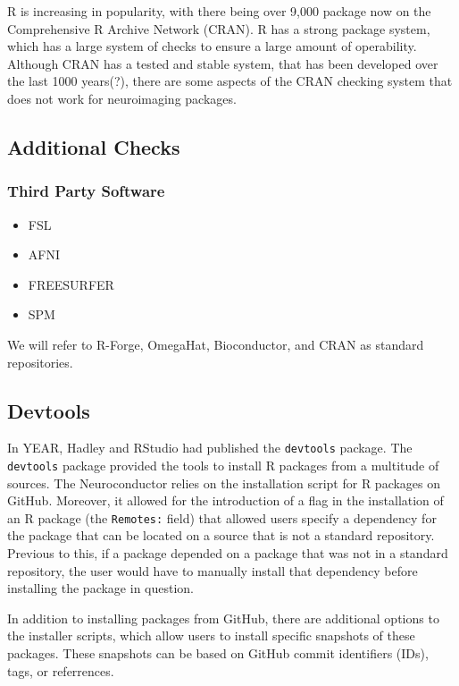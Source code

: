 \documentclass[]{elsarticle} %
\providecommand{\tightlist}{%
  \setlength{\itemsep}{0pt}\setlength{\parskip}{0pt}}
\begin{document}
R is increasing in popularity, with there being over 9,000 package now
on the Comprehensive R Archive Network (CRAN). R has a strong package
system, which has a large system of checks to ensure a large amount of
operability. Although CRAN has a tested and stable system, that has been
developed over the last 1000 years(?), there are some aspects of the
CRAN checking system that does not work for neuroimaging packages.

\subsection{Additional Checks}\label{additional-checks}

\subsubsection{Third Party Software}\label{third-party-software}

\begin{itemize}
\tightlist
\item
  FSL
\item
  AFNI
\item
  FREESURFER
\item
  SPM
\end{itemize}

We will refer to R-Forge, OmegaHat, Bioconductor, and CRAN as standard
repositories.

\subsection{Devtools}\label{devtools}

In YEAR, Hadley and RStudio had published the \texttt{devtools} package.
The \texttt{devtools} package provided the tools to install R packages
from a multitude of sources. The Neuroconductor relies on the
installation script for R packages on GitHub. Moreover, it allowed for
the introduction of a flag in the installation of an R package (the
\texttt{Remotes:} field) that allowed users specify a dependency for the
package that can be located on a source that is not a standard
repository. Previous to this, if a package depended on a package that
was not in a standard repository, the user would have to manually
install that dependency before installing the package in question.

In addition to installing packages from GitHub, there are additional
options to the installer scripts, which allow users to install specific
snapshots of these packages. These snapshots can be based on GitHub
commit identifiers (IDs), tags, or referrences.
\end{document}
